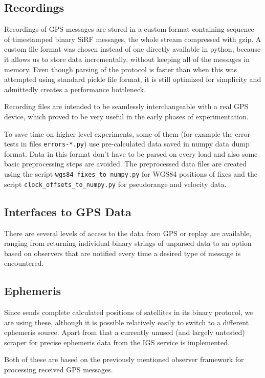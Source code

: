 \subsection{Recordings}
\label{sec:impl-recordings}
Recordings of GPS messages are stored in a custom format containing sequence
of timestamped binary SiRF messages, the whole stream compressed with gzip.
A custom file format was chosen instead of one directly available in python,
because it allows us to store data incrementally, without keeping all of the
messages in memory.
Even though parsing of the protocol is faster than when this was attempted
using standard pickle file format, it is still optimized for simplicity
and admittedly creates a performance bottleneck.

Recording files are intended to be seamlessly interchangeable with a real GPS device,
which proved to be very useful in the early phases of experimentation.

To save time on higher level experiments, some of them (for example the error tests
in files \verb=errors-*.py=)
use pre-calculated data saved in numpy data dump format.
Data in this format don't have to be parsed on every load and also some basic
preprocessing steps are avoided.
The preprocessed data files are created using the script \verb=wgs84_fixes_to_numpy.py=
for WGS84 positions of fixes and the script \verb=clock_offsets_to_numpy.py= for pseudorange
and velocity data.

\subsection{Interfaces to GPS Data}
There are several levels of access to the data from GPS or replay are available,
ranging from returning individual binary strings of unparsed data to an option based
on observers that are notified every time a desired type of message is encountered.

\subsection{Ephemeris}
Since \sirf sends complete calculated positions of satellites in its binary
protocol, we are using these, although it is possible relatively easily to switch
to a different ephemeris source.
Apart from that a currently unused (and largely untested) scraper for precise
ephemeris data from the IGS service \cite{orbit-data} is implemented.

Both of these are based on the previously mentioned observer framework for processing
received GPS messages.

